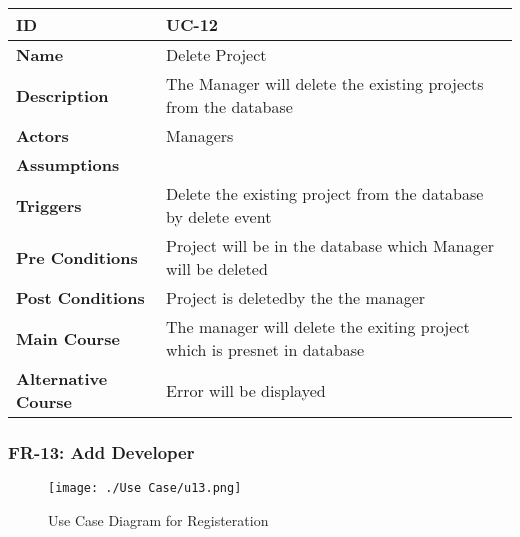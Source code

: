     \begin{center}
        \begin{tabularx}{\textwidth}{|l|X|}
            \hline
            \textbf{ID} & UC-12 \\
            \hline
            \textbf{Name} & Delete Project \\
            \hline
            \textbf{Description} & The Manager will delete the existing projects from the database \\
            \hline
            \textbf{Actors} & Managers \\
            \hline
            \textbf{Assumptions} &  \\
            \hline
            \textbf{Triggers} & Delete the existing project from the database by delete event \\
            \hline
            \textbf{Pre Conditions} & Project will be in the database which Manager will be deleted \\
            \hline
            \textbf{Post Conditions} & Project is deletedby the the manager \\
            \hline
            \textbf{Main Course} & The manager will delete the exiting project which is presnet in database \\
            \hline
            \textbf{Alternative Course} & Error will be displayed \\
            \hline
            
        \end{tabularx}
    \end{center}
    \newpage
    

    \subsubsection{FR-13: Add Developer}
    \begin{figure}[H]
        \texttt{[image: ./Use Case/u13.png]}
        \centering 
        \caption{Use Case Diagram for Registeration}
        \label{fig:prototype1}
        \end{figure}
        
